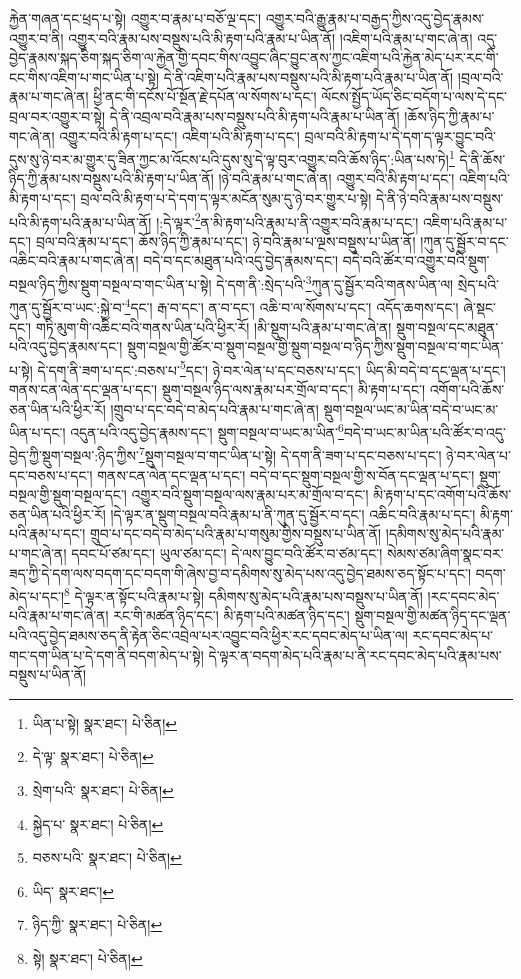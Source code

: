རྐྱེན་གཞན་དང་ཕྲད་པ་སྟེ། འགྱུར་བ་རྣམ་པ་བཅོ་ལྔ་དང་། འགྱུར་བའི་རྒྱུ་རྣམ་པ་བརྒྱད་ཀྱིས་འདུ་བྱེད་རྣམས་འགྱུར་བ་ནི། འགྱུར་བའི་རྣམ་པས་བསྡུས་པའི་མི་རྟག་པའི་རྣམ་པ་ཡིན་ནོ། །འཇིག་པའི་རྣམ་པ་གང་ཞེ་ན། འདུ་བྱེད་རྣམས་སྐད་ཅིག་སྐད་ཅིག་ལ་རྐྱེན་གྱི་དབང་གིས་འབྱུང་ཞིང་བྱུང་ནས་ཀྱང་འཇིག་པའི་རྐྱེན་མེད་པར་རང་གི་ངང་གིས་འཇིག་པ་གང་ཡིན་པ་སྟེ། དེ་ནི་འཇིག་པའི་རྣམ་པས་བསྡུས་པའི་མི་རྟག་པའི་རྣམ་པ་ཡིན་ནོ། །བྲལ་བའི་རྣམ་པ་གང་ཞེ་ན། ཕྱི་ནང་གི་དངོས་པོ་སྔོན་རྗེ་དཔོན་ལ་སོགས་པ་དང་། ལོངས་སྤྱོད་ཡོད་ཅིང་བདོག་པ་ལས་དེ་དང་བྲལ་བར་འགྱུར་བ་སྟེ། དེ་ནི་འབྲལ་བའི་རྣམ་པས་བསྡུས་པའི་མི་རྟག་པའི་རྣམ་པ་ཡིན་ནོ། །ཆོས་ཉིད་ཀྱི་རྣམ་པ་གང་ཞེ་ན། འགྱུར་བའི་མི་རྟག་པ་དང་། འཇིག་པའི་མི་རྟག་པ་དང་། བྲལ་བའི་མི་རྟག་པ་དེ་དག་ད་ལྟར་བྱུང་བའི་དུས་སུ་ཉེ་བར་མ་གྱུར་དུ་ཟིན་ཀྱང་མ་འོངས་པའི་དུས་སུ་དེ་ལྟ་བུར་འགྱུར་བའི་ཆོས་ཉིད་:ཡིན་པས་ཏེ།\footnote{ཡིན་པ་སྟེ།  སྣར་ཐང་།  པེ་ཅིན། } དེ་ནི་ཆོས་ཉིད་ཀྱི་རྣམ་པས་བསྡུས་པའི་མི་རྟག་པ་ཡིན་ནོ། །ཉེ་བའི་རྣམ་པ་གང་ཞེ་ན། འགྱུར་བའི་མི་རྟག་པ་དང་། འཇིག་པའི་མི་རྟག་པ་དང་། བྲལ་བའི་མི་རྟག་པ་དེ་དག་ད་ལྟར་མངོན་སུམ་དུ་ཉེ་བར་གྱུར་པ་སྟེ། དེ་ནི་ཉེ་བའི་རྣམ་པས་བསྡུས་པའི་མི་རྟག་པའི་རྣམ་པ་ཡིན་ནོ། །:དེ་ལྟར་\footnote{དེ་ལྟ་  སྣར་ཐང་།  པེ་ཅིན། }ན་མི་རྟག་པའི་རྣམ་པ་ནི་འགྱུར་བའི་རྣམ་པ་དང་། འཇིག་པའི་རྣམ་པ་དང་། བྲལ་བའི་རྣམ་པ་དང་། ཆོས་ཉིད་ཀྱི་རྣམ་པ་དང་། ཉེ་བའི་རྣམ་པ་ལྔས་བསྡུས་པ་ཡིན་ནོ། །ཀུན་དུ་སྦྱོར་བ་དང་འཆིང་བའི་རྣམ་པ་གང་ཞེ་ན། བདེ་བ་དང་མཐུན་པའི་འདུ་བྱེད་རྣམས་དང་། བདེ་བའི་ཚོར་བ་འགྱུར་བའི་སྡུག་བསྔལ་ཉིད་ཀྱིས་སྡུག་བསྔལ་བ་གང་ཡིན་པ་སྟེ། དེ་དག་ནི་:སྲེད་པའི་\footnote{སྲེག་པའི་  སྣར་ཐང་།  པེ་ཅིན། }ཀུན་དུ་སྦྱོར་བའི་གནས་ཡིན་ལ། སྲེད་པའི་ཀུན་དུ་སྦྱོར་བ་ཡང་:སྐྱེ་བ་\footnote{སྐྱེད་པ་  སྣར་ཐང་།  པེ་ཅིན། }དང་། རྒ་བ་དང་། ན་བ་དང་། འཆི་བ་ལ་སོགས་པ་དང་། འདོད་ཆགས་དང་། ཞེ་སྡང་དང་། གཏི་མུག་གི་འཆིང་བའི་གནས་ཡིན་པའི་ཕྱིར་རོ། །མི་སྡུག་པའི་རྣམ་པ་གང་ཞེ་ན། སྡུག་བསྔལ་དང་མཐུན་པའི་འདུ་བྱེད་རྣམས་དང་། སྡུག་བསྔལ་གྱི་ཚོར་བ་སྡུག་བསྔལ་གྱི་སྡུག་བསྔལ་བ་ཉིད་ཀྱིས་སྡུག་བསྔལ་བ་གང་ཡིན་པ་སྟེ། དེ་དག་ནི་ཟག་པ་དང་:བཅས་པ་\footnote{བཅས་པའི་  སྣར་ཐང་།  པེ་ཅིན། }དང་། ཉེ་བར་ལེན་པ་དང་བཅས་པ་དང་། ཡིད་མི་བདེ་བ་དང་ལྡན་པ་དང་། གནས་ངན་ལེན་དང་ལྡན་པ་དང་། སྡུག་བསྔལ་ཉིད་ལས་རྣམ་པར་གྲོལ་བ་དང་། མི་རྟག་པ་དང་། འགོག་པའི་ཆོས་ཅན་ཡིན་པའི་ཕྱིར་རོ། །གྲུབ་པ་དང་བདེ་བ་མེད་པའི་རྣམ་པ་གང་ཞེ་ན། སྡུག་བསྔལ་ཡང་མ་ཡིན་བདེ་བ་ཡང་མ་ཡིན་པ་དང་། འདུན་པའི་འདུ་བྱེད་རྣམས་དང་། སྡུག་བསྔལ་བ་ཡང་མ་ཡིན་\footnote{ཡིད་  སྣར་ཐང་། }བདེ་བ་ཡང་མ་ཡིན་པའི་ཚོར་བ་འདུ་བྱེད་ཀྱི་སྡུག་བསྔལ་:ཉིད་ཀྱིས་\footnote{ཉིད་ཀྱི་  སྣར་ཐང་།  པེ་ཅིན། }སྡུག་བསྔལ་བ་གང་ཡིན་པ་སྟེ། དེ་དག་ནི་ཟག་པ་དང་བཅས་པ་དང་། ཉེ་བར་ལེན་པ་དང་བཅས་པ་དང་། གནས་ངན་ལེན་དང་ལྡན་པ་དང་། བདེ་བ་དང་སྡུག་བསྔལ་གྱི་ས་བོན་དང་ལྡན་པ་དང་། སྡུག་བསྔལ་གྱི་སྡུག་བསྔལ་དང་། འགྱུར་བའི་སྡུག་བསྔལ་ལས་རྣམ་པར་མ་གྲོལ་བ་དང་། མི་རྟག་པ་དང་འགོག་པའི་ཆོས་ཅན་ཡིན་པའི་ཕྱིར་རོ། །དེ་ལྟར་ན་སྡུག་བསྔལ་བའི་རྣམ་པ་ནི་ཀུན་དུ་སྦྱོར་བ་དང་། འཆིང་བའི་རྣམ་པ་དང་། མི་རྟག་པའི་རྣམ་པ་དང་། གྲུབ་པ་དང་བདེ་བ་མེད་པའི་རྣམ་པ་གསུམ་གྱིས་བསྡུས་པ་ཡིན་ནོ། །དམིགས་སུ་མེད་པའི་རྣམ་པ་གང་ཞེ་ན། དབང་པོ་ཙམ་དང་། ཡུལ་ཙམ་དང་། དེ་ལས་བྱུང་བའི་ཚོར་བ་ཙམ་དང་། སེམས་ཙམ་ཞིག་སྣང་བར་ཟད་ཀྱི་དེ་དག་ལས་བདག་དང་བདག་གི་ཞེས་བྱ་བ་དམིགས་སུ་མེད་པས་འདུ་བྱེད་ཐམས་ཅད་སྟོང་པ་དང་། བདག་མེད་པ་དང་།\footnote{སྟེ།  སྣར་ཐང་།  པེ་ཅིན། } དེ་ལྟར་ན་སྟོང་པའི་རྣམ་པ་སྟེ། དམིགས་སུ་མེད་པའི་རྣམ་པས་བསྡུས་པ་ཡིན་ནོ། །རང་དབང་མེད་པའི་རྣམ་པ་གང་ཞེ་ན། རང་གི་མཚན་ཉིད་དང་། མི་རྟག་པའི་མཚན་ཉིད་དང་། སྡུག་བསྔལ་གྱི་མཚན་ཉིད་དང་ལྡན་པའི་འདུ་བྱེད་ཐམས་ཅད་ནི་རྟེན་ཅིང་འབྲེལ་པར་འབྱུང་བའི་ཕྱིར་རང་དབང་མེད་པ་ཡིན་ལ། རང་དབང་མེད་པ་གང་དག་ཡིན་པ་དེ་དག་ནི་བདག་མེད་པ་སྟེ། དེ་ལྟར་ན་བདག་མེད་པའི་རྣམ་པ་ནི་རང་དབང་མེད་པའི་རྣམ་པས་བསྡུས་པ་ཡིན་ནོ། 